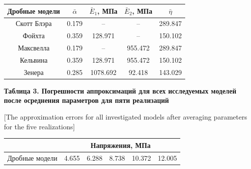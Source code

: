 \documentclass[11pt,a4paper,twoside]{article}
\begin{document}
\begin{center}
\begin{tabular}{|c||c|c|c|c|} %


\hline 


\rule{0mm}{11pt}%


\footnotesize Дробные модели & \footnotesize  $\bar{\alpha}$ & \footnotesize  $\bar{E}_{1}$, МПа & \footnotesize  $\bar{E}_{2}$, МПа & \footnotesize  $\bar{\eta}$  \\


			\hline 


			\rule{0mm}{12pt}%


			Скотт Блэра & 0.179  &  --  &  --  & 289.847   \\


			Фойхта & 0.359  & \phantom{1}128.971 & -- &  150.102 \\ 


			Максвелла & 0.179 &  --  & 955.472 & 289.847 \\


			Кельвина & 0.359 & \phantom{1}128.971 & 955.472 & 150.102 \\


			Зенера & 0.285 & 1078.692 & \phantom{1}92.418 & 143.029 \\			


			\hline


		\end{tabular}		


	


\smallskip





{\bf\footnotesize Таблица 3. Погрешности аппроксимаций для всех исследуемых моделей после осреднения параметров для пяти реализаций


[The approximation errors for all investigated models after averaging parameters for the five realizations] }








\begin{tabular}{|c||c|c|c|c|c|} %


\hline 


\rule{0mm}{11pt}%


 & \multicolumn{5}{c|}{Напряжения, МПа}\\ \hline 


\footnotesize Дробные модели & \footnotesize  4.655  & \footnotesize  6.288 & \footnotesize  8.738  & \footnotesize  10.372 & \footnotesize  12.005  \\



\end{tabular}
\end{center}
\end{document}
